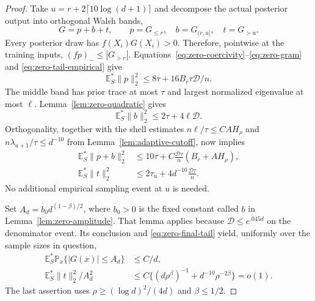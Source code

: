 \begin{proof}
Take $u=r+2\lceil10\log(d+1)\rceil$ and decompose the actual posterior
output into orthogonal Walsh bands,
\[
 G=p+b+t,\qquad p=G_{\le r},\quad b=G_{(r,u]},\quad t=G_{>u}.
\]
Every posterior draw has $f(X_i)G(X_i)>0$. Therefore, pointwise at
the training inputs, $(fp)_-\le|G_{>r}|$.
Equations~\eqref{eq:zero-coercivity}--\eqref{eq:zero-gram} and
\eqref{eq:zero-tail-empirical} give
\begin{equation}\label{eq:zero-head}
 \mathbb E_S^*\|p\|_2^2
 \le8\tau+16 B_r\tau\mathcal D/n.
\end{equation}
The middle band has prior trace at most $\tau$ and largest normalized
eigenvalue at most $\ell$. Lemma~\ref{lem:zero-quadratic} gives
\[
 \mathbb E_S^*\|b\|_2^2\le2\tau+4\ell\mathcal D.
\]
Orthogonality, together with the shell estimates
$n\ell/\tau\le CAH_\rho$ and
$n\lambda_{u+1}/\tau\le d^{-10}$ from
Lemma~\ref{lem:adaptive-cutoff}, now implies
\begin{align}
 \mathbb E_S^*\|p+b\|_2^2
 &\le10\tau+C\frac{\mathcal D\tau}{n}(B_r+AH_\rho),
 \label{eq:zero-low-norm}\\
 \mathbb E_S^*\|t\|_2^2
 &\le2\tau_u+4d^{-10}\frac{\mathcal D\tau}{n}.
 \label{eq:zero-final-tail}
\end{align}
No additional empirical sampling event at $u$ is needed.

Set $A_d=b_0d^{(1-\beta)/2}$, where $b_0>0$ is the fixed constant called
$b$ in Lemma~\ref{lem:zero-amplitude}. That lemma applies because
$\mathcal D\le e^{.045d}$ on the denominator event.
Its conclusion and \eqref{eq:zero-final-tail} yield, uniformly over
the sample sizes in question,
\begin{align}
 \mathbb E_S^*\mathbb P_x\{|G(x)|\le A_d\}&\le C/d,
 \label{eq:zero-large-outputs}\\
 \mathbb E_S^*\|t\|_2^2/A_d^2
 &\le C\{(d\rho^\beta)^{-1}+d^{-10}\rho^{-2\beta}\}=o(1).
 \label{eq:zero-tail-relative}
\end{align}
The last assertion uses $\rho\ge(\log d)^2/(4d)$ and $\beta\le1/2$.


\end{proof}
